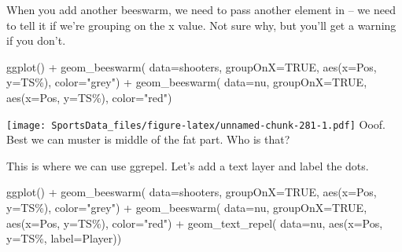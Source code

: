\documentclass[
]{book}
\newenvironment{Shaded}{\begin{snugshade}}{\end{snugshade}}
\newcommand{\AttributeTok}[1]{\textcolor[rgb]{0.77,0.63,0.00}{#1}}
\newcommand{\ConstantTok}[1]{\textcolor[rgb]{0.00,0.00,0.00}{#1}}
\newcommand{\FunctionTok}[1]{\textcolor[rgb]{0.00,0.00,0.00}{#1}}
\newcommand{\NormalTok}[1]{#1}
\newcommand{\SpecialCharTok}[1]{\textcolor[rgb]{0.00,0.00,0.00}{#1}}
\newcommand{\StringTok}[1]{\textcolor[rgb]{0.31,0.60,0.02}{#1}}
\begin{document}
When you add another beeswarm, we need to pass another element in -- we need to tell it if we're grouping on the x value. Not sure why, but you'll get a warning if you don't.

\begin{Shaded}
\begin{Highlighting}[]
\FunctionTok{ggplot}\NormalTok{() }\SpecialCharTok{+} 
  \FunctionTok{geom\_beeswarm}\NormalTok{(}
    \AttributeTok{data=}\NormalTok{shooters, }
    \AttributeTok{groupOnX=}\ConstantTok{TRUE}\NormalTok{, }
    \FunctionTok{aes}\NormalTok{(}\AttributeTok{x=}\NormalTok{Pos, }\AttributeTok{y=}\StringTok{\textasciigrave{}}\AttributeTok{TS\%}\StringTok{\textasciigrave{}}\NormalTok{), }\AttributeTok{color=}\StringTok{"grey"}\NormalTok{) }\SpecialCharTok{+} 
  \FunctionTok{geom\_beeswarm}\NormalTok{(}
    \AttributeTok{data=}\NormalTok{nu, }
    \AttributeTok{groupOnX=}\ConstantTok{TRUE}\NormalTok{, }
    \FunctionTok{aes}\NormalTok{(}\AttributeTok{x=}\NormalTok{Pos, }\AttributeTok{y=}\StringTok{\textasciigrave{}}\AttributeTok{TS\%}\StringTok{\textasciigrave{}}\NormalTok{), }\AttributeTok{color=}\StringTok{"red"}\NormalTok{)}
\end{Highlighting}
\end{Shaded}

\texttt{[image: SportsData\_files/figure-latex/unnamed-chunk-281-1.pdf]}
Ooof. Best we can muster is middle of the fat part. Who is that?

This is where we can use ggrepel. Let's add a text layer and label the dots.

\begin{Shaded}
\begin{Highlighting}[]
\FunctionTok{ggplot}\NormalTok{() }\SpecialCharTok{+} 
  \FunctionTok{geom\_beeswarm}\NormalTok{(}
    \AttributeTok{data=}\NormalTok{shooters, }
    \AttributeTok{groupOnX=}\ConstantTok{TRUE}\NormalTok{, }
    \FunctionTok{aes}\NormalTok{(}\AttributeTok{x=}\NormalTok{Pos, }\AttributeTok{y=}\StringTok{\textasciigrave{}}\AttributeTok{TS\%}\StringTok{\textasciigrave{}}\NormalTok{), }\AttributeTok{color=}\StringTok{"grey"}\NormalTok{) }\SpecialCharTok{+} 
  \FunctionTok{geom\_beeswarm}\NormalTok{(}
    \AttributeTok{data=}\NormalTok{nu, }
    \AttributeTok{groupOnX=}\ConstantTok{TRUE}\NormalTok{, }
    \FunctionTok{aes}\NormalTok{(}\AttributeTok{x=}\NormalTok{Pos, }\AttributeTok{y=}\StringTok{\textasciigrave{}}\AttributeTok{TS\%}\StringTok{\textasciigrave{}}\NormalTok{), }\AttributeTok{color=}\StringTok{"red"}\NormalTok{) }\SpecialCharTok{+} 
  \FunctionTok{geom\_text\_repel}\NormalTok{(}
    \AttributeTok{data=}\NormalTok{nu, }
    \FunctionTok{aes}\NormalTok{(}\AttributeTok{x=}\NormalTok{Pos, }\AttributeTok{y=}\StringTok{\textasciigrave{}}\AttributeTok{TS\%}\StringTok{\textasciigrave{}}\NormalTok{, }\AttributeTok{label=}\NormalTok{Player))}
\end{Highlighting}
\end{Shaded}
\end{document}

